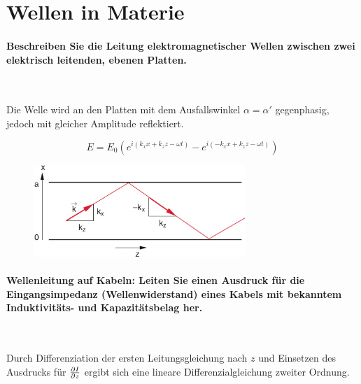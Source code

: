 \documentclass[a4paper, 11pt, ngerman, parskip=half-]{scrartcl}
\begin{document}
\newpage

\section{Wellen in Materie}

\paragraph{Beschreiben Sie die Leitung elektromagnetischer Wellen zwischen zwei elektrisch
    leitenden, ebenen Platten.} ~

Die Welle wird an den Platten mit dem Ausfallswinkel $\alpha = \alpha'$ gegenphasig, jedoch mit
gleicher Amplitude reflektiert.

\begin{equation}
    E = E_0(e^{i(k_x x + k_z z - \omega t)} - e^{i(-k_x x + k_z z - \omega t)})
\end{equation}

\begin{figure}[H]
    \centering
    \includegraphics[width=8cm]{image/14/1}
\end{figure}

\paragraph{Wellenleitung auf Kabeln: Leiten Sie einen Ausdruck für die Eingangsimpedanz
    (Wellenwiderstand) eines Kabels mit bekanntem Induktivitäts- und Kapazitätsbelag her.} ~

Durch Differenziation der ersten Leitungsgleichung nach $z$ und Einsetzen des Ausdrucks für
$\pdv{I}{z}$ ergibt sich eine lineare Differenzialgleichung zweiter Ordnung.
\end{document}
